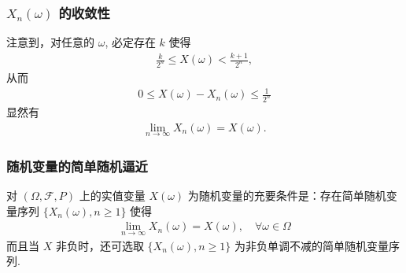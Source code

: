 \documentclass[Prob-All.tex]{subfiles}
\begin{document}
\begin{frame}
	\frametitle{$X_n (\omega)$ 的收敛性}
	注意到，对任意的 $\omega$, 必定存在 $k$ 使得
	\begin{eqnarray*}
		\frac{k}{2^n}\le X(\omega)<\frac{k+1}{2^n},
	\end{eqnarray*}
	\pause 从而
	\begin{eqnarray*}
		0\le X(\omega)-X_n(\omega)\le \frac{1}{2^n}
	\end{eqnarray*}
	\pause 显然有
	\begin{eqnarray*}
		\lim_{n\rightarrow \infty}X_n(\omega)=X(\omega).
	\end{eqnarray*}
\end{frame}
\begin{frame}
	\frametitle{随机变量的简单随机逼近}
	\begin{thm}
		对 $(\Omega,\mathcal{F},P)$ 上的实值变量 $X (\omega)$ 为随机变量的充要条件是：存在简单随机变量序列 $\{X_n (\omega),n\ge 1\}$ 使得
		\begin{eqnarray*}
			\lim_{n\rightarrow \infty}X_n(\omega)=X(\omega), \quad \forall \omega\in \Omega
		\end{eqnarray*}
		而且当 $X$ 非负时，还可选取 $\{X_n (\omega),n\ge 1\}$ 为非负单调不减的简单随机变量序列.
	\end{thm}
\end{frame}
\end{document}
